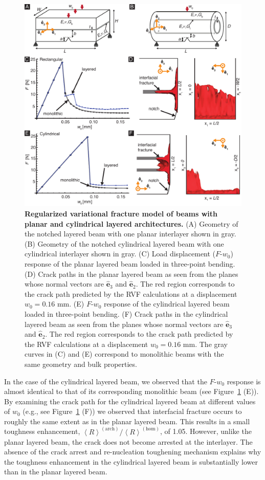 \documentclass[12pt,onecolumn]{article}
\newcommand{\ey}{\hat{\mathbf{e}}_2}
\newcommand{\ez}{\hat{\mathbf{e}}_3}
\begin{document}
			\begin{figure}[ht!]
			\includegraphics[width=\textwidth]{../Figures/FigureVRF/FigureVRF_V3.pdf}
			\caption{\textbf{Regularized variational fracture model of beams with planar and cylindrical layered architectures.} (A) Geometry of the notched layered beam with one planar interlayer shown in gray. (B) Geometry of the notched cylindrical layered beam with one cylindrical interlayer shown in gray. (C) Load displacement ($F$-$w_0$) response of the planar layered beam loaded in three-point bending.  (D) Crack paths in the planar layered beam as seen from the planes whose normal vectors are $\ez$ and $\ey$. The red region corresponds to the crack path predicted by the RVF calculations at a displacement $w_0=0.16$ mm. (E) $F$-$w_0$ response of the cylindrical layered beam loaded in three-point bending.  (F) Crack paths in the cylindrical layered beam as seen from the planes whose normal vectors are $\ez$ and $\ey$. The red region corresponds to the crack path predicted by the RVF calculations at a displacement $w_0=0.16$ mm. The gray curves in (C) and (E) correspond to monolithic beams with the same geometry and bulk properties.}
			\label{fig:VF}
			\end{figure}

In the case of the cylindrical layered beam, we observed that the $F$-$w_0$ response is almost identical to that of its corresponding monolithic beam (see Figure~\ref{fig:VF} (E)). By examining the crack path for the cylindrical layered beam at different values of $w_0$ (e.g., see Figure~\ref{fig:VF} (F)) we observed that interfacial fracture occurs to roughly the same extent as in the planar layered beam. This results in a small toughness enhancement, $\left< R\right>^{(\mathrm{arch})}/\left< R\right>^{(\mathrm{hom})}$, of 1.05. However, unlike the planar layered beam, the crack does not become arrested at the interlayer. The absence of the crack arrest and re-nucleation toughening mechanism explains why the toughness enhancement in the cylindrical layered beam is substantially lower than in the planar layered beam.
\end{document}
